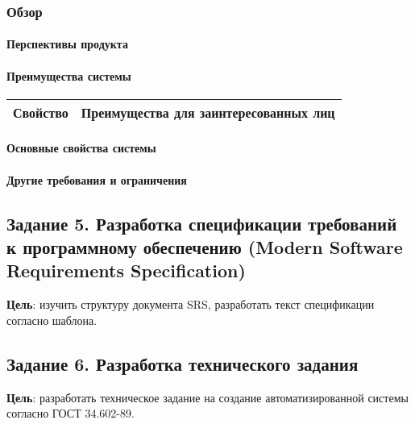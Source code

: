 \documentclass[a4paper, 14pt]{extarticle}
\begin{document}

\subsubsection*{Обзор}

\paragraph*{Перспективы продукта}


\paragraph*{Преимущества системы}


\begin{longtable}{|L{0.47\textwidth}|L{0.47\textwidth}|}
  \hline
  \textbf{Свойство} & \textbf{Преимущества для заинтересованных лиц} \\
  \hline
\end{longtable}

\paragraph*{Основные свойства системы}


\paragraph*{Другие требования и ограничения}


\subsection*{
  Задание 5. Разработка спецификации требований к программному обеспечению
  (Modern Software Requirements Specification)
}

\textbf{Цель}: изучить структуру документа SRS, разработать текст спецификации
согласно шаблона.


\subsection*{Задание 6. Разработка технического задания}

\textbf{Цель}: разработать техническое задание на создание автоматизированной
системы согласно ГОСТ 34.602-89.
\end{document}
